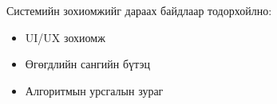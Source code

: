 Системийн зохиомжийг дараах байдлаар тодорхойлно:
\begin{itemize}
    \item UI/UX зохиомж
    \item Өгөгдлийн сангийн бүтэц
    \item Алгоритмын урсгалын зураг
\end{itemize}

